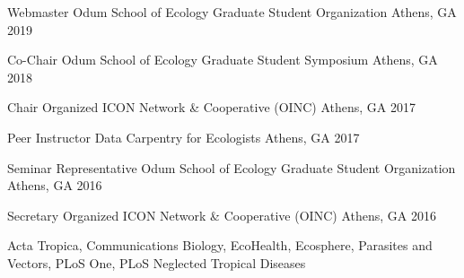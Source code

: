 
\begin{cvhonors}
\cvhonor
    {Webmaster} %
    {Odum School of Ecology Graduate Student Organization} %
    {Athens, GA} %
    {2019} %

\cvhonor
    {Co-Chair} %
    {Odum School of Ecology Graduate Student Symposium} %
    {Athens, GA} %
    {2018} %

\cvhonor
    {Chair} %
    {Organized ICON Network \& Cooperative (OINC)} %
    {Athens, GA} %
    {2017} %

\cvhonor
    {Peer Instructor} %
    {Data Carpentry for Ecologists} %
    {Athens, GA} %
    {2017} %

\cvhonor
    {Seminar Representative} %
    {Odum School of Ecology Graduate Student Organization} %
    {Athens, GA} %
    {2016} %

\cvhonor
    {Secretary} %
    {Organized ICON Network \& Cooperative (OINC)} %
    {Athens, GA} %
    {2016} %

\end{cvhonors}


Acta Tropica, Communications Biology, EcoHealth, Ecosphere, Parasites and Vectors, PLoS One, PLoS Neglected Tropical Diseases



